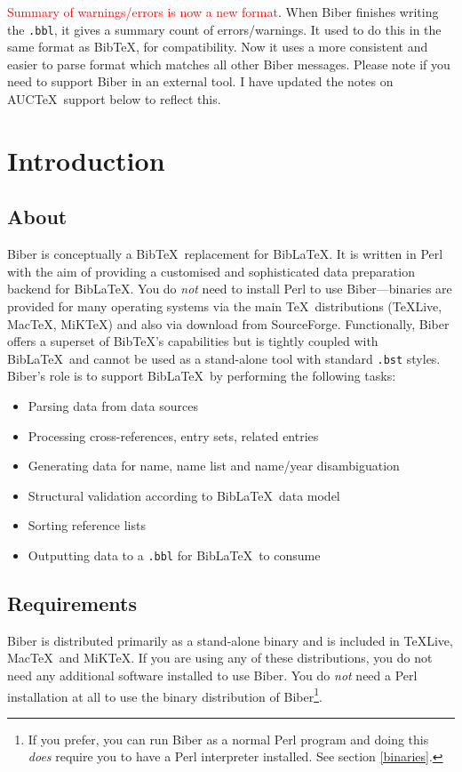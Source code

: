 \documentclass{ltxdockit}
\begin{document}
\noindent \textcolor{red}{Summary of warnings/errors is now a new format}.
When Biber finishes writing the \verb+.bbl+, it gives a summary
count of errors/warnings. It used to do this in the same format as
Bib\TeX, for compatibility. Now it uses a more consistent and easier
to parse format which matches all other Biber messages. Please note
if you need to support Biber in an external tool. I have updated the
notes on AUC\TeX\ support below to reflect this.

\section{Introduction}\label{int}

\subsection{About}

Biber is conceptually a Bib\TeX\ replacement for
Bib\LaTeX. It is written in Perl with the aim of providing a
customised and sophisticated data preparation backend for Bib\LaTeX.
You do \emph{not} need to install Perl to use Biber---binaries
are provided for many operating systems via the main \TeX\
distributions (\TeX Live, Mac\TeX, MiK\TeX) and also via download from SourceForge.
Functionally, Biber offers a superset of Bib\TeX's capabilities but is
tightly coupled with Bib\LaTeX\ and cannot be used as a stand-alone tool
with standard \verb+.bst+ styles. Biber's role is to support
Bib\LaTeX\ by performing the following tasks:

\begin{itemize}
\item Parsing data from data sources
\item Processing cross-references, entry sets, related entries
\item Generating data for name, name list and name/year disambiguation
\item Structural validation according to Bib\LaTeX\ data model
\item Sorting reference lists
\item Outputting data to a \verb+.bbl+ for Bib\LaTeX\ to consume
\end{itemize}

\subsection{Requirements}\label{ref:req}

Biber is distributed primarily as a stand-alone binary and is
included in \TeX Live, Mac\TeX\ and MiK\TeX. If you are using any of these
distributions, you do not need any additional software installed to use
Biber. You do \emph{not} need a Perl installation at all to use
the binary distribution of Biber\footnote{If you prefer, you can run
Biber as a normal Perl program and doing this \emph{does} require
you to have a Perl interpreter installed. See section \ref{binaries}.}.
\end{document}
